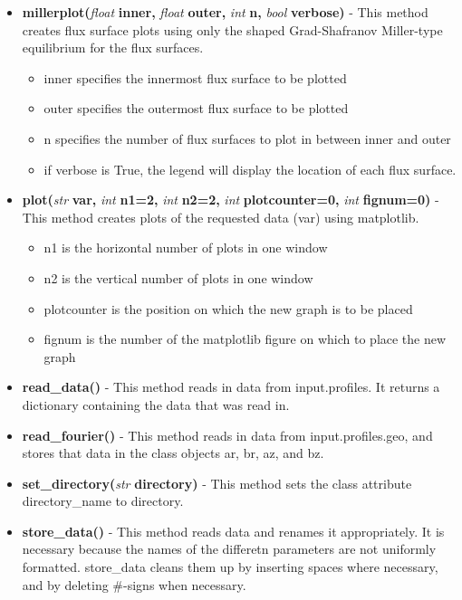 \documentclass{article}
\begin{document}
\begin{itemize}
\begin{itemize}
\item \textbf{millerplot(}\emph{float}\textbf{ inner, }\emph{float}\textbf{ outer, }\emph{int}\textbf{ n, }\emph{bool}\textbf{ verbose)} - This method creates flux surface plots using only the shaped Grad-Shafranov Miller-type equilibrium for the flux surfaces.
\begin{itemize}
\item inner specifies the innermost flux surface to be plotted
\item outer specifies the outermost flux surface to be plotted
\item n specifies the number of flux surfaces to plot in between inner and outer
\item if verbose is True, the legend will display the location of each flux surface.
\end{itemize}
\item \textbf{plot(}\emph{str}\textbf{ var, }\emph{int}\textbf{ n1=2, }\emph{int}\textbf{ n2=2, }\emph{int}\textbf{ plotcounter=0, }\emph{int}\textbf{ fignum=0)} - This method creates plots of the requested data (var) using matplotlib.
\begin{itemize}
\item n1 is the horizontal number of plots in one window
\item n2 is the vertical number of plots in one window
\item plotcounter is the position on which the new graph is to be placed
\item fignum is the number of the matplotlib figure on which to place the new graph
\end{itemize}
\item \textbf{read\_data()} - This method reads in data from input.profiles.  It returns a dictionary containing the data that was read in.
\item \textbf{read\_fourier()} - This method reads in data from input.profiles.geo, and stores that data in the class objects ar, br, az, and bz.
\item \textbf{set\_directory(}\emph{str}\textbf{ directory)} - This method sets the class attribute directory\_name to directory.
\item \textbf{store\_data()} - This method reads data and renames it appropriately.  It is necessary because the names of the differetn parameters are not uniformly formatted.  store\_data cleans them up by inserting spaces where necessary, and by deleting \#-signs when necessary.
\end{itemize}
\end{itemize}
\end{document}
